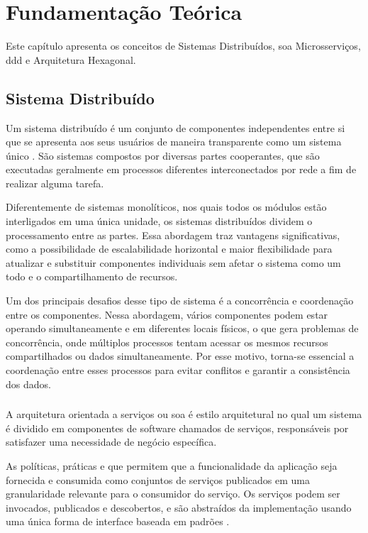 \chapter{Fundamentação Teórica}
\label{cap:fundamentacao}

Este capítulo apresenta os conceitos de Sistemas Distribuídos, \acrfull{soa} Microsserviços, \acrfull{ddd} e Arquitetura Hexagonal.

\section{Sistema Distribuído} 
\label{section:sistemas_distribuidos}

Um sistema distribuído é um conjunto de componentes independentes entre si que se apresenta aos seus usuários de maneira transparente como um sistema único \cite{tanenbaum2010sistemas}. São sistemas compostos por diversas partes cooperantes, que são executadas geralmente em processos diferentes interconectados por rede a fim de realizar alguma tarefa. 

Diferentemente de sistemas monolíticos, nos quais todos os módulos estão interligados em uma única unidade, os sistemas distribuídos dividem o processamento entre as partes. Essa abordagem traz vantagens significativas, como a possibilidade de escalabilidade horizontal e maior flexibilidade para atualizar e substituir componentes individuais sem afetar o sistema como um todo e o compartilhamento de recursos.

Um dos principais desafios desse tipo de sistema é a concorrência e coordenação entre os componentes. Nessa abordagem, vários componentes podem estar operando simultaneamente e em diferentes locais físicos, o que gera problemas de concorrência, onde múltiplos processos tentam acessar os mesmos recursos compartilhados ou dados simultaneamente. Por esse motivo, torna-se essencial a coordenação entre esses processos para evitar conflitos e garantir a consistência dos dados.

\subsection{} 
A arquitetura orientada a serviços ou \acrfull{soa} é estilo arquitetural no qual um sistema é dividido em componentes de software chamados de serviços, responsáveis por satisfazer uma necessidade de negócio específica.

As políticas, práticas e  que permitem que a funcionalidade da aplicação seja fornecida e consumida como conjuntos de serviços publicados em uma granularidade relevante para o consumidor do serviço. Os serviços podem ser invocados, publicados e descobertos, e são abstraídos da implementação usando uma única forma de interface baseada em padrões \cite{understandingSOA}.

